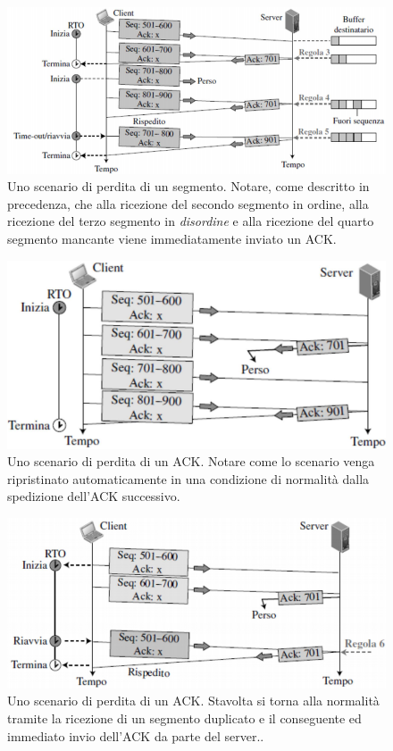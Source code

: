\documentclass[11pt,a4paper,oneside]{book}
\theoremstyle{definition}
\begin{document}
\pagebreak

\begin{figure}[!h]
	\includegraphics[scale=0.3]{Immagini/Loss_op.png}
	\centering
	\caption{Uno scenario di perdita di un segmento. Notare, come descritto in precedenza, che alla ricezione del secondo segmento in ordine, alla ricezione del terzo segmento in \textit{disordine} e alla ricezione del quarto segmento mancante viene immediatamente inviato un ACK.}
\end{figure}
\begin{figure}[!h]
	\includegraphics[scale=0.3]{Immagini/ACK_lost.png}
	\centering
	\caption{Uno scenario di perdita di un ACK. Notare come lo scenario venga ripristinato automaticamente in una condizione di normalità dalla spedizione dell'ACK successivo.}
\end{figure}
\begin{figure}[!h]
	\includegraphics[scale=0.25]{Immagini/ACK_retr.png}
	\centering
	\caption{Uno scenario di perdita di un ACK. Stavolta si torna alla normalità tramite la ricezione di un segmento duplicato e il conseguente ed immediato invio dell'ACK da parte del server..}
\end{figure}
\end{document}
